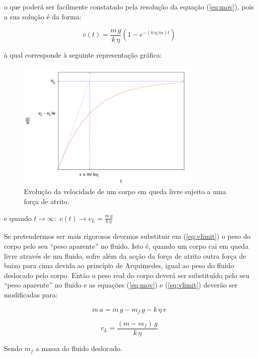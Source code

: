 \documentclass[a4paper,twoside,12pt]{article}      %
\begin{document}
o que poderá ser facilmente constatado pela resolução da equação (\ref{eq:mov}), pois a sua solução é da forma:

\begin{equation}
	\label{eq:vlimita}
	v(t) = \frac{m\,g}{k  \, \eta} (1 - e^{- (k\,\eta / m) t})
\end{equation}

à qual corresponde à seguinte representação gráfica:
\begin{figure}
	[!htb]  \centering 
	\includegraphics[width=0.8\textwidth]{./plote}
	\caption{ Evolução da velocidade de um corpo em queda livre sujeito a uma força de atrito. \label{fig:vLim}} 
\end{figure}

e quando $t \to \infty :\; v(t) \to v_L = \frac{m\,g}{k  \, \eta} $

Se pretendermos ser mais rigorosos devemos substituir  em (\ref{eq:vlimit}) o peso do corpo pelo seu “peso aparente” no fluido. Isto é, quando um corpo cai em queda livre através de um fluido, sofre além da acção da força de atrito outra força de baixo para cima devida ao princípio de Arquimedes, igual ao peso do fluido deslocado pelo corpo. Então o peso real do corpo deverá ser substituído pelo seu “peso aparente” no fluido e as equações (\ref{eq:mov}) e (\ref{eq:vlimit}) deverão ser modificadas para:

\begin{equation}
	\label{eq:mov2}
	m\,a = m\,g - m_f\,g  - k  \, \eta \, v
\end{equation}


\begin{equation}
	\label{eq:vlimit2}
	v_L = \frac{(m - m_f)\,g}{k  \, \eta}
\end{equation}

Sendo $m_f$ a massa do fluido deslocado.
\end{document}
